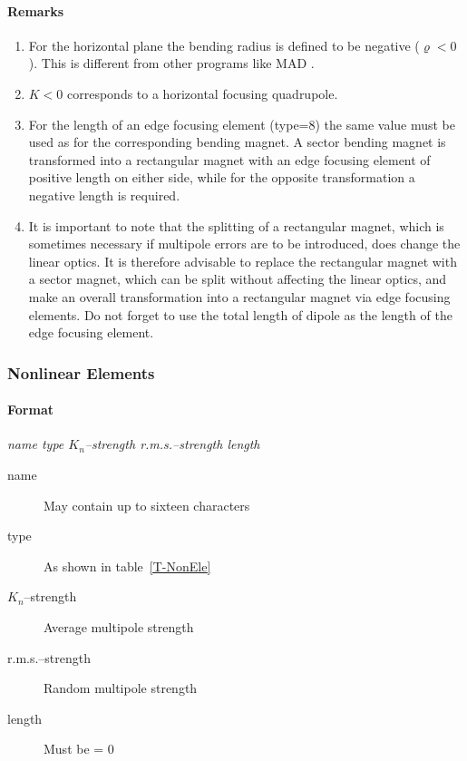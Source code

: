 \documentclass[a4paper,11pt]{report}
\begin{document}
\paragraph{Remarks}
\begin{enumerate}
\item For the horizontal plane the bending radius is defined to be
  negative \mbox{($ \varrho < 0 $).} This is different from other
  programs like MAD \cite{MAD}.
\item $ K < 0 $ corresponds to a horizontal focusing quadrupole.
\item For the length of an edge focusing element (type=8) the same
  value must be used as for the corresponding bending magnet. A sector
  bending magnet is transformed into a rectangular magnet with an edge
  focusing element of positive length on either side, while for the
  opposite transformation a negative length is required.
\item It is important to note that the splitting of a rectangular
  magnet, which is sometimes necessary if multipole errors are to be
  introduced, does change the linear optics.  It is therefore
  advisable to replace the rectangular magnet with a sector magnet,
  which can be split without affecting the linear optics, and make an
  overall transformation into a rectangular magnet via edge focusing
  elements. Do not forget to use the total length of dipole as the
  length of the edge focusing element.
\end{enumerate}

\subsubsection{Nonlinear Elements} \label{NonEle}

\paragraph{Format} {\em name type $K_{n}$--strength r.m.s.--strength
  length }
\begin{description}
\item [name] May contain up to sixteen characters
\item [type] As shown in table~\ref{T-NonEle}
\item [$K_{n}$--strength] Average multipole strength
\item [r.m.s.--strength] Random multipole strength
\item [length] Must be = 0
\end{description}
\end{document}
